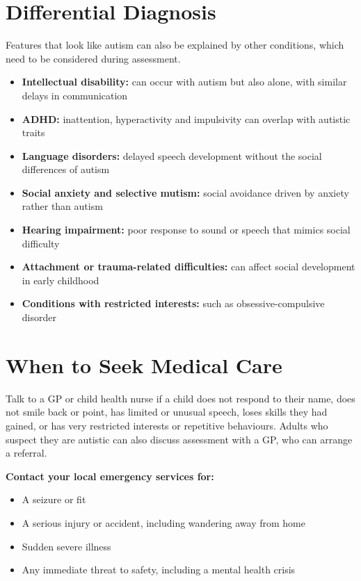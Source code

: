 \section*{Differential Diagnosis}
Features that look like autism can also be explained by other conditions, which need to be considered during assessment.

\begin{itemize}
    \item \textbf{Intellectual disability:} can occur with autism but also alone, with similar delays in communication
    \item \textbf{ADHD:} inattention, hyperactivity and impulsivity can overlap with autistic traits
    \item \textbf{Language disorders:} delayed speech development without the social differences of autism
    \item \textbf{Social anxiety and selective mutism:} social avoidance driven by anxiety rather than autism
    \item \textbf{Hearing impairment:} poor response to sound or speech that mimics social difficulty
    \item \textbf{Attachment or trauma-related difficulties:} can affect social development in early childhood
    \item \textbf{Conditions with restricted interests:} such as obsessive-compulsive disorder
\end{itemize}

\section*{When to Seek Medical Care}
Talk to a GP or child health nurse if a child does not respond to their name, does not smile back or point, has limited or unusual speech, loses skills they had gained, or has very restricted interests or repetitive behaviours. Adults who suspect they are autistic can also discuss assessment with a GP, who can arrange a referral.

\textbf{Contact your local emergency services for:}
\begin{itemize}
    \item A seizure or fit
    \item A serious injury or accident, including wandering away from home
    \item Sudden severe illness
    \item Any immediate threat to safety, including a mental health crisis
\end{itemize}

